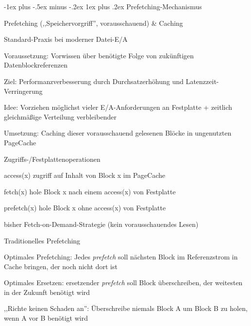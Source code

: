 \documentclass[a4paper]{article}
\makeatletter
\renewcommand{\subsubsection}{\@startsection{subsubsection}{3}{0mm}%
 {-1ex plus -.5ex minus -.2ex}%
 {1ex plus .2ex}%
 {\normalfont\small\bfseries}}
\makeatother
\begin{document}
\begin{multicols}{3}
    \subsubsection{Prefetching-Mechanismus}
    \begin{itemize*}
        \item Prefetching (,,Speichervorgriff'', vorausschauend) \& Caching
        \begin{itemize*}
            \item Standard-Praxis bei moderner Datei-E/A
            \item Voraussetzung: Vorwissen über benötigte Folge von zukünftigen Datenblockreferenzen
            \item Ziel: Performanzverbesserung durch Durchsatzerhöhung und Latenzzeit-Verringerung
            \item Idee: Vorziehen möglichst vieler E/A-Anforderungen an Festplatte + zeitlich gleichmäßige Verteilung verbleibender
            \item Umsetzung: Caching dieser vorausschauend gelesenen Blöcke in ungenutzten PageCache
        \end{itemize*}
        \item Zugriffs-/Festplattenoperationen
        \begin{description*}
            \item[access(x)] zugriff auf Inhalt von Block x im PageCache
            \item[fetch(x)] hole Block x nach einem access(x) von Festplatte
            \item[prefetch(x)] hole Block x ohne access(x) von Festplatte
        \end{description*}
        \item bisher Fetch-on-Demand-Strategie (kein vorausschauendes Lesen)
        \item Traditionelles Prefetching
        \begin{enumerate*}
            \item Optimales Prefetching: Jedes \emph{prefetch} soll nächsten Block im Referenzstrom in Cache bringen, der noch nicht dort ist
            \item Optimales Ersetzen: ersetzender \emph{prefetch} soll Block überschreiben, der weitesten in der Zukunft benötigt wird
            \item ,,Richte keinen Schaden an'': Überschreibe niemals Block A um Block B zu holen, wenn A vor B benötigt wird

\end{enumerate*}
\end{itemize*}
\end{multicols}
\end{document}
